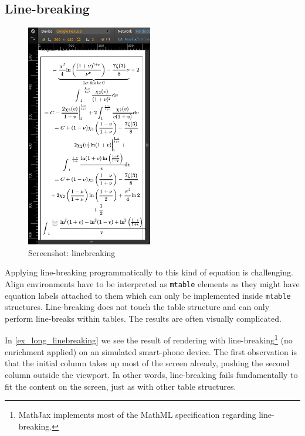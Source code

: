 \documentclass{llncs}
\begin{document}
\subsection{Line-breaking}
\begin{figure}
  \vspace{-50pt}
  \centering 
  \includegraphics[width=0.49\textwidth]{./ex_long_linebreaking.png}
  \caption{Screenshot: linebreaking\label{ex_long_linebreaking}}
  \vspace{-40pt}
\end{figure}

Applying line-breaking programmatically to this kind of equation is 
challenging. Align environments have to be interpreted as \texttt{mtable} 
elements as they might have equation labels attached to them which can only 
be implemented inside \texttt{mtable} structures. 
Line-breaking does not touch the table structure and can only perform 
line-breaks within tables. The results are often visually complicated.


In \autoref{ex_long_linebreaking} we see the result of rendering with 
line-breaking\footnote{MathJax implements most of the MathML specification 
regarding line-breaking.} (no enrichment applied)  on an simulated 
smart-phone device. The first observation is that the initial column takes up 
most of the screen already, pushing the second column outside the viewport. In 
other words, line-breaking fails fundamentally to fit the content on the screen, 
just as with other table structures.
\end{document}
